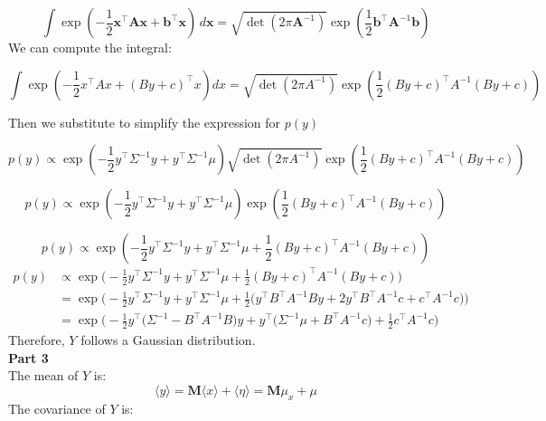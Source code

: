 \documentclass{article}
\begin{document}
\[
\int \exp \left( -\frac{1}{2} \mathbf{x}^\top \mathbf{A} \mathbf{x} + \mathbf{b}^\top \mathbf{x} \right) \, d\mathbf{x} = \sqrt{\det (2 \pi \mathbf{A}^{-1})} \exp \left( \frac{1}{2} \mathbf{b}^\top \mathbf{A}^{-1} \mathbf{b} \right)
\]
We can compute the integral: 

\[
\int \exp \left( -\frac{1}{2} x^\top A x +  (B y + c)^\top x \right) dx = \sqrt{\det (2 \pi {A}^{-1})} \exp \left( \frac{1}{2} (B y + c)^\top {A}^{-1} (B y + c) \right)
\]

Then we substitute to simplify the expression for $p(y)$

\[
p(y) \propto \exp \left( -\frac{1}{2} y^\top \Sigma^{-1} y + y^\top \Sigma^{-1} \mu \right)  \sqrt{\det (2 \pi {A}^{-1})} \exp \left( \frac{1}{2} (B y + c)^\top {A}^{-1} (B y + c) \right)
\]

\[
p(y) \propto \exp \left( -\frac{1}{2} y^\top \Sigma^{-1} y + y^\top \Sigma^{-1} \mu \right)  \exp \left( \frac{1}{2} (B y + c)^\top {A}^{-1} (B y + c) \right)
\]


\[
p(y) \propto \exp \left( -\frac{1}{2} y^\top \Sigma^{-1} y + y^\top \Sigma^{-1} \mu + \frac{1}{2} (B y + c)^\top {A}^{-1} (B y + c) \right)
\]
\begin{align*}
p(y) &\propto \exp \Bigg( -\frac{1}{2} y^\top \Sigma^{-1} y + y^\top \Sigma^{-1} \mu + \frac{1}{2} (B y + c)^\top A^{-1} (B y + c) \Bigg) \\
&= \exp \Bigg( -\frac{1}{2} y^\top \Sigma^{-1} y + y^\top \Sigma^{-1} \mu + \frac{1}{2} \big( y^\top B^\top A^{-1} B y + 2 y^\top B^\top A^{-1} c + c^\top A^{-1} c \big) \Bigg) \\
&= \exp \Bigg( -\frac{1}{2} y^\top\big(  \Sigma^{-1} -  B^\top A^{-1} B  \big)y + y^\top \big( \Sigma^{-1} \mu + B^\top A^{-1} c \big) + \frac{1}{2} c^\top A^{-1} c \Bigg)
\end{align*}
Therefore, $Y$ follows a Gaussian distribution. \\

\textbf{Part 3}\\

The mean of $Y$ is:
\[
\langle y \rangle = \mathbf{M} \langle x \rangle + \langle \eta \rangle = \mathbf{M} \mu_x + \mu
\]
The covariance of $Y$ is:
\end{document}
